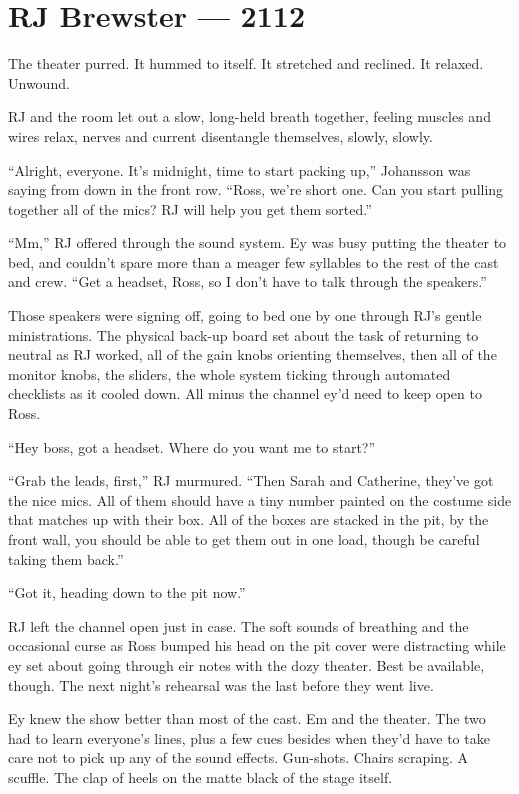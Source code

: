 \hypertarget{rj-brewster-2112}{%
\chapter*{RJ Brewster — 2112}\label{rj-brewster-2112}}

The theater purred. It hummed to itself. It stretched and reclined. It relaxed. Unwound.

RJ and the room let out a slow, long-held breath together, feeling muscles and wires relax, nerves and current disentangle themselves, slowly, slowly.

``Alright, everyone. It's midnight, time to start packing up,'' Johansson was saying from down in the front row. ``Ross, we're short one. Can you start pulling together all of the mics? RJ will help you get them sorted.''

``Mm,'' RJ offered through the sound system. Ey was busy putting the theater to bed, and couldn't spare more than a meager few syllables to the rest of the cast and crew. ``Get a headset, Ross, so I don't have to talk through the speakers.''

Those speakers were signing off, going to bed one by one through RJ's gentle ministrations. The physical back-up board set about the task of returning to neutral as RJ worked, all of the gain knobs orienting themselves, then all of the monitor knobs, the sliders, the whole system ticking through automated checklists as it cooled down. All minus the channel ey'd need to keep open to Ross.

``Hey boss, got a headset. Where do you want me to start?''

``Grab the leads, first,'' RJ murmured. ``Then Sarah and Catherine, they've got the nice mics. All of them should have a tiny number painted on the costume side that matches up with their box. All of the boxes are stacked in the pit, by the front wall, you should be able to get them out in one load, though be careful taking them back.''

``Got it, heading down to the pit now.''

RJ left the channel open just in case. The soft sounds of breathing and the occasional curse as Ross bumped his head on the pit cover were distracting while ey set about going through eir notes with the dozy theater. Best be available, though. The next night's rehearsal was the last before they went live.

Ey knew the show better than most of the cast. Em and the theater. The two had to learn everyone's lines, plus a few cues besides when they'd have to take care not to pick up any of the sound effects. Gun-shots. Chairs scraping. A scuffle. The clap of heels on the matte black of the stage itself.

